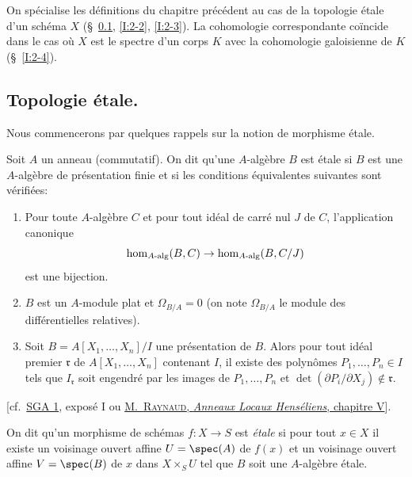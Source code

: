 On spécialise les définitions du chapitre précédent au cas de la 
topologie étale d'un schéma $X$ (\S~\ref{I:2-1}, \ref{I:2-2}, \ref{I:2-3}). La 
cohomologie correspondante coïncide dans le cas où $X$ est le spectre d'un 
corps $K$ avec la cohomologie galoisienne de $K$ (\S~\ref{I:2-4}). 










\subsection{Topologie étale.}\label{I:2-1}

Nous commencerons par quelques rappels sur la notion de morphisme étale. 

\begin{definitiondash}\label{I:2-1-1}
Soit $A$ un anneau (commutatif). On dit qu'une $A$-algèbre $B$ est étale si 
$B$ est une $A$-algèbre de présentation finie et si les conditions 
équivalentes suivantes sont vérifiées:
\begin{enumerate}[\indent a)]
  \item Pour toute $A$-algèbre $C$ et pour tout idéal de carré nul $J$ de 
    $C$, l'application canonique 
    \[
      \hom_{A\textnormal{-alg}}(B,C) \to \hom_{A\textnormal{-alg}}(B,C/J)
    \]
    est une bijection.
  \item $B$ est un $A$-module plat et $\Omega_{B/A}=0$ (on note $\Omega_{B/A}$ 
    le module des différentielles relatives).
  \item Soit $B=A[X_1,\dotsc,X_n]/I$ une présentation de $B$. Alors pour tout 
    idéal premier $\mathfrak{r}$ de $A[X_1,\dotsc,X_n]$ contenant $I$, il existe des 
    polynômes $P_1,\dotsc,P_n\in I$ tels que $I_{\mathfrak{r}}$ soit engendré par les 
    images de $P_1,\dotsc,P_n$ et $\det(\partial P_i/\partial X_j)\notin \mathfrak{r}$.  
\end{enumerate}
\end{definitiondash}
[cf.\ \hyperlink{cite.sga1}{SGA 1}, exposé I ou
\hyperlink{cite.ra70}{M.~\textsc{Raynaud}, \emph{Anneaux Locaux Henséliens}, chapitre V}].

On dit qu'un morphisme de schémas $f:X\to S$ est \emph{étale} si pour tout 
$x\in X$ il existe un voisinage ouvert affine $U=\spec(A)$ de $f(x)$ et un 
voisinage ouvert affine $V=\spec(B)$ de $x$ dans $X\times_S U$ tel que $B$ soit 
une $A$-algèbre étale. 






